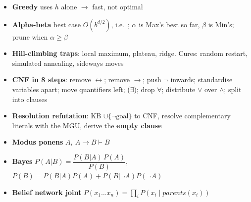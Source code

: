 {\begin{itemize}
        $h$ is \textbf{consistent} ($h(n) \le c(n,n') + h(n')$)
  \item \textbf{Greedy} uses $h$ alone $\rightarrow$ fast, not optimal
  \item \textbf{Alpha-beta} best case $O(b^{d/2})$, i.e.\ ; $\alpha$ is Max's best so far, $\beta$ is Min's;
        prune when $\alpha \ge \beta$
  \item \textbf{Hill-climbing traps}: local maximum, plateau, ridge. Cures: random
        restart, simulated annealing, sideways moves
\end{itemize}
\begin{itemize}
  \item \textbf{CNF in 8 steps}: remove $\leftrightarrow$; remove $\rightarrow$; push
        $\neg$ inwards; standardise variables apart; move quantifiers left;
         ($\exists$); drop $\forall$; distribute
        $\vee$ over $\wedge$; split into clauses
  \item \textbf{Resolution refutation}: KB $\cup \{\neg\text{goal}\}$ to CNF, resolve
        complementary literals with the MGU, derive the \textbf{empty clause}
  \item \textbf{Modus ponens} $A,\ A \rightarrow B \vdash B$
  \item \textbf{Bayes} $P(A|B) = \dfrac{P(B|A)\,P(A)}{P(B)}$, \
        $P(B) = P(B|A)P(A) + P(B|\neg A)P(\neg A)$
  \item \textbf{Belief network joint}
        $P(x_1 \ldots x_n) = \prod_i P(x_i \mid parents(x_i))$
\end{itemize}}

